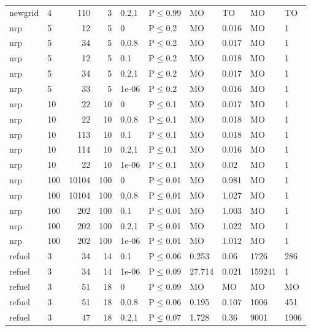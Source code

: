 \begin{longtable}{llrrllllll}
 newgrid       & 4         &    	110 &   3 & 0.2,1 & P$\leq$0.99  & MO       & TO       & MO      & TO      \\
 nrp           & 5         &     	12 &   5 & 0     & P$\leq$0.2   & MO       & 0.016    & MO      & 1       \\
 nrp           & 5         &     	34 &   5 & 0,0.8 & P$\leq$0.2   & MO       & 0.017    & MO      & 1       \\
 nrp           & 5         &     	12 &   5 & 0.1   & P$\leq$0.2   & MO       & 0.018    & MO      & 1       \\
 nrp           & 5         &     	34 &   5 & 0.2,1 & P$\leq$0.2   & MO       & 0.017    & MO      & 1       \\
 nrp           & 5         &     	33 &   5 & 1e-06 & P$\leq$0.2   & MO       & 0.016    & MO      & 1       \\
 nrp           & 10        &     	22 &  10 & 0     & P$\leq$0.1   & MO       & 0.017    & MO      & 1       \\
 nrp           & 10        &     	22 &  10 & 0,0.8 & P$\leq$0.1   & MO       & 0.018    & MO      & 1       \\
 nrp           & 10        &    	113 &  10 & 0.1   & P$\leq$0.1   & MO       & 0.018    & MO      & 1       \\
 nrp           & 10        &    	114 &  10 & 0.2,1 & P$\leq$0.1   & MO       & 0.016    & MO      & 1       \\
 nrp           & 10        &     	22 &  10 & 1e-06 & P$\leq$0.1   & MO       & 0.02     & MO      & 1       \\
 nrp           & 100       &  	10104 & 100 & 0     & P$\leq$0.01  & MO       & 0.981    & MO      & 1       \\
 nrp           & 100       &  	10104 & 100 & 0,0.8 & P$\leq$0.01  & MO       & 1.027    & MO      & 1       \\
 nrp           & 100       &    	202 & 100 & 0.1   & P$\leq$0.01  & MO       & 1.003    & MO      & 1       \\
 nrp           & 100       &    	202 & 100 & 0.2,1 & P$\leq$0.01  & MO       & 1.022    & MO      & 1       \\
 nrp           & 100       &    	202 & 100 & 1e-06 & P$\leq$0.01  & MO       & 1.012    & MO      & 1       \\
 refuel        & 3         &     	34 &  14 & 0.1   & P$\leq$0.06  & 0.253    & 0.06     & 1726    & 286     \\
 refuel        & 3         &     	34 &  14 & 1e-06 & P$\leq$0.09  & 27.714   & 0.021    & 159241  & 1       \\
 refuel        & 3         &     	51 &  18 & 0     & P$\leq$0.09  & MO       & MO       & MO      & MO      \\
 refuel        & 3         &     	51 &  18 & 0,0.8 & P$\leq$0.06  & 0.195    & 0.107    & 1006    & 451     \\
 refuel        & 3         &     	47 &  18 & 0.2,1 & P$\leq$0.07  & 1.728    & 0.36     & 9001    & 1906    \\
\bottomrule
\end{longtable}
